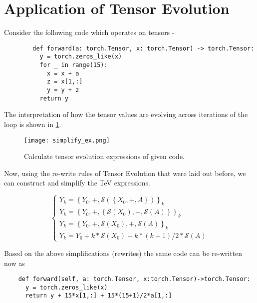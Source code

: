 \documentclass{article}
\begin{document}
    \section{Application of Tensor Evolution}
    
    Consider the following code which operates on tensors -
    \begin{verbatim}
        def forward(a: torch.Tensor, x: torch.Tensor) -> torch.Tensor:
          y = torch.zeros_like(x)
          for _ in range(15):
            x = x + a
            z = x[1,:]
            y = y + z
          return y
    \end{verbatim}
    The interpretation of how the tensor values are evolving across iterations of the loop is shown in \ref{fig:TEV_Code_Example}. 
    
    \begin{figure}[h!]
    \centering
      \texttt{[image: simplify\_ex.png]}
      \caption{Calculate tensor evolution expressions of given code.}
      \label{fig:TEV_Code_Example}
    \end{figure}
    

    Now, using the re-write rules of Tensor Evolution that were laid out before, we can construct and simplify the TeV expressions.
    
    \begin{equation}
    \begin{cases}
    Y_k = \left\{  Y_0, +, \mathcal{S}( \left\{ X_0, +, A\right\})    \right\}_k \\
    Y_k= \left\{  Y_0, +,  \left\{\mathcal{S}(X_0), +, \mathcal{S}(A)\right\}    \right\}_k \\
    Y_k= \left\{  Y_0, +,  \mathcal{S}(X_0), +, \mathcal{S}(A) \right\}_k \\
    Y_k= Y_0 + k * \mathcal{S}(X_0) + k*(k+1)/2 *  \mathcal{S}(A)    
    \end{cases}
    \end{equation}
    
    Based on the above simplifications (rewrites) the same code can be re-written now as 
    \begin{verbatim}
    def forward(self, a: torch.Tensor, x:torch.Tensor)->torch.Tensor: 
      y = torch.zeros_like(x)
      return y + 15*x[1,:] + 15*(15+1)/2*a[1,:]
    \end{verbatim}
    
\end{document}
